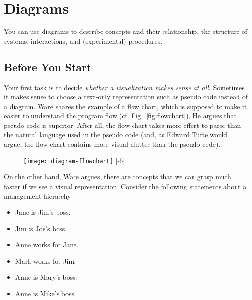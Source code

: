 \section{Diagrams}

You can use diagrams to describe concepts and their relationship, the structure of systems, interactions, and (experimental) procedures.


\subsection{Before You Start}

Your first task is to decide \emph{whether a visualization makes sense at all}. Sometimes it makes sense to choose a text-only representation such as pseudo code instead of a diagram. Ware \cite{Ware12} shares the example of a flow chart, which is supposed to make it easier to understand the program flow (cf. Fig.~\ref{fig:flowchart}). He argues that pseudo code is superior. After all, the flow chart takes more effort to parse than the natural language used in the pseudo code (and, as Edward Tufte would argue, the flow chart contains more visual clutter than the pseudo code).

\begin{figure}[t]
\centering
\texttt{[image: diagram-flowchart]}
[-6\baselineskip]
\end{figure}

On the other hand, Ware argues, there are concepts that we can grasp much faster if we see a visual representation. Consider the following statements about a management hierarchy \cite{Ware12}:

\begin{itemize}
  \item Jane is Jim’s boss.
  \item Jim is Joe’s boss.
  \item Anne works for Jane.
  \item Mark works for Jim.
  \item Anne is Mary’s boss.
  \item Anne is Mike’s boss
\end{itemize}


